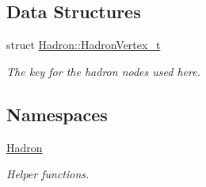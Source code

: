 \subsection*{Data Structures}
\begin{DoxyCompactItemize}
\item 
struct \mbox{\hyperlink{structHadron_1_1HadronVertex__t}{Hadron\+::\+Hadron\+Vertex\+\_\+t}}
\begin{DoxyCompactList}\small\item\em The key for the hadron nodes used here. \end{DoxyCompactList}\end{DoxyCompactItemize}
\subsection*{Namespaces}
\begin{DoxyCompactItemize}
\item 
 \mbox{\hyperlink{namespaceHadron}{Hadron}}
\begin{DoxyCompactList}\small\item\em Helper functions. \end{DoxyCompactList}\end{DoxyCompactItemize}
